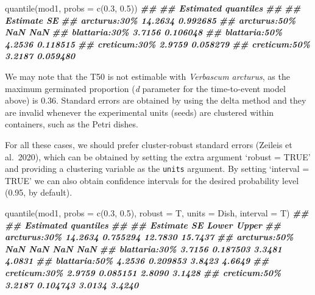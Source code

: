 \documentclass[
]{book}
\newenvironment{Shaded}{\begin{snugshade}}{\end{snugshade}}
\newcommand{\AttributeTok}[1]{\textcolor[rgb]{0.77,0.63,0.00}{#1}}
\newcommand{\DocumentationTok}[1]{\textcolor[rgb]{0.56,0.35,0.01}{\textbf{\textit{#1}}}}
\newcommand{\FloatTok}[1]{\textcolor[rgb]{0.00,0.00,0.81}{#1}}
\newcommand{\FunctionTok}[1]{\textcolor[rgb]{0.00,0.00,0.00}{#1}}
\newcommand{\NormalTok}[1]{#1}
\begin{document}
\begin{Shaded}
\begin{Highlighting}[]
\FunctionTok{quantile}\NormalTok{(mod1, }\AttributeTok{probs =} \FunctionTok{c}\NormalTok{(}\FloatTok{0.3}\NormalTok{, }\FloatTok{0.5}\NormalTok{))}
\DocumentationTok{\#\# }
\DocumentationTok{\#\# Estimated quantiles}
\DocumentationTok{\#\# }
\DocumentationTok{\#\#               Estimate       SE}
\DocumentationTok{\#\# arcturus:30\%   14.2634 0.992685}
\DocumentationTok{\#\# arcturus:50\%       NaN      NaN}
\DocumentationTok{\#\# blattaria:30\%   3.7156 0.106048}
\DocumentationTok{\#\# blattaria:50\%   4.2536 0.118515}
\DocumentationTok{\#\# creticum:30\%    2.9759 0.058279}
\DocumentationTok{\#\# creticum:50\%    3.2187 0.059480}
\end{Highlighting}
\end{Shaded}

We may note that the T50 is not estimable with \emph{Verbascum arcturus}, as the maximum germinated proportion (\emph{d} parameter for the time-to-event model above) is 0.36. Standard errors are obtained by using the delta method and they are invalid whenever the experimental units (seeds) are clustered within containers, such as the Petri dishes.

For all these cases, we should prefer cluster-robust standard errors (Zeileis et al.~2020), which can be obtained by setting the extra argument `robust = TRUE' and providing a clustering variable as the \texttt{units} argument. By setting `interval = TRUE' we can also obtain confidence intervals for the desired probability level (0.95, by default).

\begin{Shaded}
\begin{Highlighting}[]
\FunctionTok{quantile}\NormalTok{(mod1, }\AttributeTok{probs =} \FunctionTok{c}\NormalTok{(}\FloatTok{0.3}\NormalTok{, }\FloatTok{0.5}\NormalTok{), }\AttributeTok{robust =}\NormalTok{ T,}
         \AttributeTok{units =}\NormalTok{ Dish,}
         \AttributeTok{interval =}\NormalTok{ T)}
\DocumentationTok{\#\# }
\DocumentationTok{\#\# Estimated quantiles}
\DocumentationTok{\#\# }
\DocumentationTok{\#\#               Estimate       SE   Lower   Upper}
\DocumentationTok{\#\# arcturus:30\%   14.2634 0.755294 12.7830 15.7437}
\DocumentationTok{\#\# arcturus:50\%       NaN      NaN     NaN     NaN}
\DocumentationTok{\#\# blattaria:30\%   3.7156 0.187503  3.3481  4.0831}
\DocumentationTok{\#\# blattaria:50\%   4.2536 0.209853  3.8423  4.6649}
\DocumentationTok{\#\# creticum:30\%    2.9759 0.085151  2.8090  3.1428}
\DocumentationTok{\#\# creticum:50\%    3.2187 0.104743  3.0134  3.4240}
\end{Highlighting}
\end{Shaded}
\end{document}
